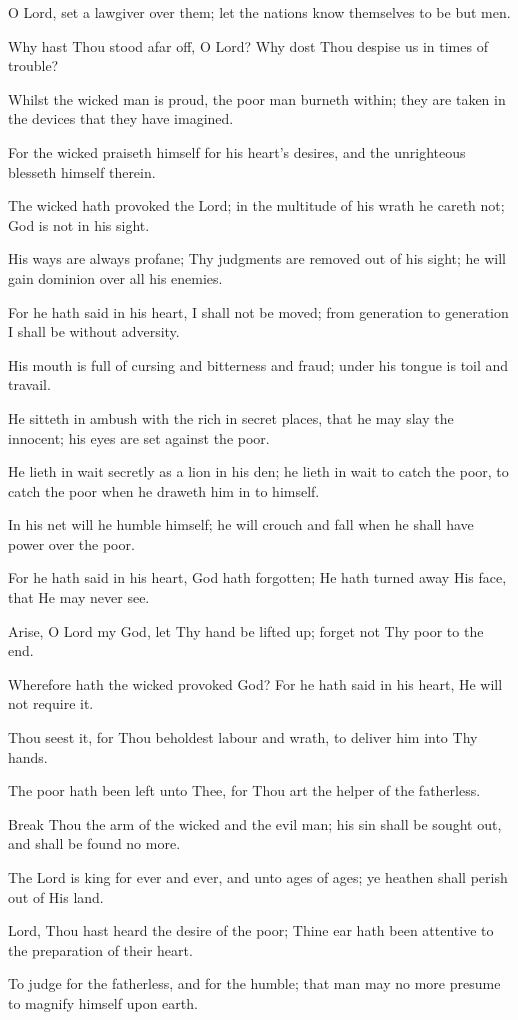 O Lord, set a lawgiver over them; let the nations know themselves to be but men.

Why hast Thou stood afar off, O Lord? Why dost Thou despise us in times of trouble?

Whilst the wicked man is proud, the poor man burneth within; they are taken in the devices that they have imagined.

For the wicked praiseth himself for his heart’s desires, and the unrighteous blesseth himself therein.

The wicked hath provoked the Lord; in the multitude of his wrath he careth not; God is not in his sight.

His ways are always profane; Thy judgments are removed out of his sight; he will gain dominion over all his enemies.

For he hath said in his heart, I shall not be moved; from generation to generation I shall be without adversity.

His mouth is full of cursing and bitterness and fraud; under his tongue is toil and travail.

He sitteth in ambush with the rich in secret places, that he may slay the innocent; his eyes are set against the poor.

He lieth in wait secretly as a lion in his den; he lieth in wait to catch the poor, to catch the poor when he draweth him in to himself.

In his net will he humble himself; he will crouch and fall when he shall have power over the poor.

For he hath said in his heart, God hath forgotten; He hath turned away His face, that He may never see.

Arise, O Lord my God, let Thy hand be lifted up; forget not Thy poor to the end.

Wherefore hath the wicked provoked God? For he hath said in his heart, He will not require it.

Thou seest it, for Thou beholdest labour and wrath, to deliver him into Thy hands.

The poor hath been left unto Thee, for Thou art the helper of the fatherless.

Break Thou the arm of the wicked and the evil man; his sin shall be sought out, and shall be found no more.

The Lord is king for ever and ever, and unto ages of ages; ye heathen shall perish out of His land.

Lord, Thou hast heard the desire of the poor; Thine ear hath been attentive to the preparation of their heart.

To judge for the fatherless, and for the humble; that man may no more presume to magnify himself upon earth.
